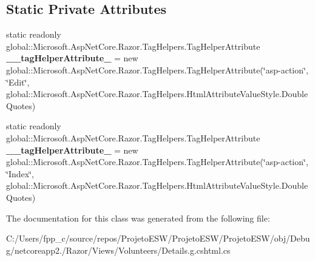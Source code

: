 \subsection*{Static Private Attributes}
\begin{DoxyCompactItemize}
\item 
\mbox{\label{class_asp_net_core_1_1_views___volunteers___details_aa78614c337251084c6eb6eeb1b763978}} 
static readonly global\+::\+Microsoft.\+Asp\+Net\+Core.\+Razor.\+Tag\+Helpers.\+Tag\+Helper\+Attribute {\bfseries \+\_\+\+\_\+tag\+Helper\+Attribute\+\_} = new global\+::\+Microsoft.\+Asp\+Net\+Core.\+Razor.\+Tag\+Helpers.\+Tag\+Helper\+Attribute(\char`\"{}asp-\/action\char`\"{}, \char`\"{}Edit\char`\"{}, global\+::\+Microsoft.\+Asp\+Net\+Core.\+Razor.\+Tag\+Helpers.\+Html\+Attribute\+Value\+Style.\+Double\+Quotes)
\item 
\mbox{\label{class_asp_net_core_1_1_views___volunteers___details_a2a02304f2d4893bef8047317aa6446a5}} 
static readonly global\+::\+Microsoft.\+Asp\+Net\+Core.\+Razor.\+Tag\+Helpers.\+Tag\+Helper\+Attribute {\bfseries \+\_\+\+\_\+tag\+Helper\+Attribute\+\_} = new global\+::\+Microsoft.\+Asp\+Net\+Core.\+Razor.\+Tag\+Helpers.\+Tag\+Helper\+Attribute(\char`\"{}asp-\/action\char`\"{}, \char`\"{}Index\char`\"{}, global\+::\+Microsoft.\+Asp\+Net\+Core.\+Razor.\+Tag\+Helpers.\+Html\+Attribute\+Value\+Style.\+Double\+Quotes)
\end{DoxyCompactItemize}


The documentation for this class was generated from the following file\+:\begin{DoxyCompactItemize}
\item 
C\+:/\+Users/fpp\+\_\+c/source/repos/\+Projeto\+E\+S\+W/\+Projeto\+E\+S\+W/\+Projeto\+E\+S\+W/obj/\+Debug/netcoreapp2./\+Razor/\+Views/\+Volunteers/Details.\+g.\+cshtml.\+cs\end{DoxyCompactItemize}
